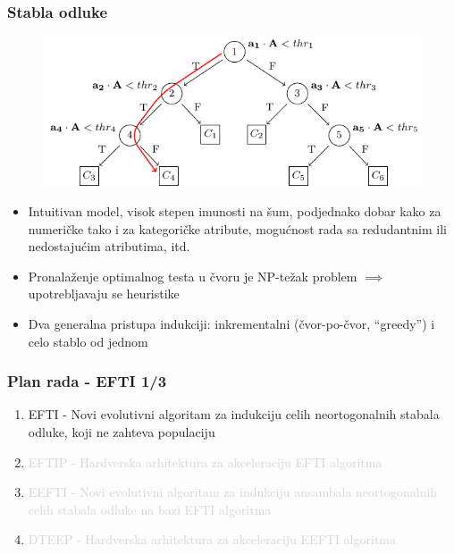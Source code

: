 \documentclass{beamer}
\newcommand{\light}[1]{\textcolor{lightgray}{#1}}
\begin{document}
\begin{frame}[fragile]
\frametitle{Stabla odluke}
\begin{figure}
\includegraphics[width=0.7\linewidth]{oblique_dt_traversal.pdf}
\end{figure}
\begin{itemize}
\setlength{\itemsep}{\fill}
\item Intuitivan model, visok stepen imunosti na šum, podjednako dobar kako za numeričke tako i za kategoričke atribute, mogućnost rada sa redudantnim ili nedostajućim atributima, itd.
\item Pronalaženje optimalnog testa u čvoru je NP-težak problem $\implies$ upotrebljavaju se heuristike
\item Dva generalna pristupa indukciji: inkrementalni (čvor-po-čvor, ``greedy'') i celo stablo od jednom
\end{itemize}
\end{frame}


\begin{frame}
\frametitle{Plan rada - EFTI 1/3}
\begin{enumerate}
\setlength{\itemsep}{\fill}
\item EFTI - Novi evolutivni algoritam za indukciju celih neortogonalnih stabala
odluke, koji ne zahteva populaciju
\item\light{EFTIP - Hardverska arhitektura za akceleraciju EFTI algoritma}
\item\light{EEFTI - Novi evolutivni algoritam za indukciju ansambala neortogonalnih celih
stabala odluke na bazi EFTI algoritma}
\item\light{DTEEP - Hardverska arhitektura za akceleraciju EEFTI algoritma}
\end{enumerate}
\end{frame}

\end{document}

